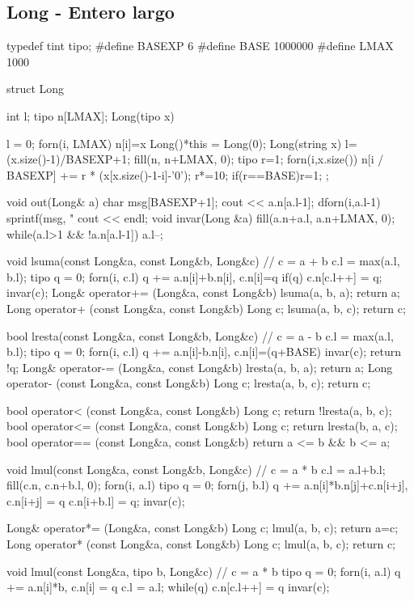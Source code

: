 \documentclass[10pt,landscape,twocolumn,a4paper,notitlepage]{article}
\begin{document}
\subsection{Long - Entero largo}\begin{code}
typedef tint tipo;
#define BASEXP 6
#define BASE 1000000
#define LMAX 1000

struct Long {
	int l;
	tipo n[LMAX];
	Long(tipo x) { 	l = 0; forn(i, LMAX) { n[i]=x%
	Long(){*this = Long(0);}
	Long(string x) {
		l=(x.size()-1)/BASEXP+1;
		fill(n, n+LMAX, 0);
		tipo r=1;
		forn(i,x.size()){
			n[i / BASEXP] += r * (x[x.size()-1-i]-'0');
			r*=10; if(r==BASE)r=1;
		}
	}
};

void out(Long& a) {
	char msg[BASEXP+1];
	cout << a.n[a.l-1];
	dforn(i,a.l-1) {
		sprintf(msg, "%
	}
	cout << endl;
}
void invar(Long &a) {
	fill(a.n+a.l, a.n+LMAX, 0);
	while(a.l>1 && !a.n[a.l-1]) a.l--;
}

void lsuma(const Long&a, const Long&b, Long&c) { // c = a + b
	c.l = max(a.l, b.l);
	tipo q = 0;
	forn(i, c.l) q += a.n[i]+b.n[i], c.n[i]=q%
	if(q) c.n[c.l++] = q;
	invar(c);
}
Long& operator+= (Long&a, const Long&b) { lsuma(a, b, a); return a; }
Long operator+ (const Long&a, const Long&b) { Long c; lsuma(a, b, c); return c; }

bool lresta(const Long&a, const Long&b, Long&c) { // c = a - b
	c.l = max(a.l, b.l);
	tipo q = 0;
	forn(i, c.l) q += a.n[i]-b.n[i], c.n[i]=(q+BASE)%
	invar(c);
	return !q;
}
Long& operator-= (Long&a, const Long&b) { lresta(a, b, a); return a; }
Long operator- (const Long&a, const Long&b) {Long c; lresta(a, b, c); return c;}

bool operator< (const Long&a, const Long&b) { Long c; return !lresta(a, b, c); }
bool operator<= (const Long&a, const Long&b) { Long c; return lresta(b, a, c); }
bool operator== (const Long&a, const Long&b) { return a <= b && b <= a; }

void lmul(const Long&a, const Long&b, Long&c) { // c = a * b
	c.l = a.l+b.l;
	fill(c.n, c.n+b.l, 0);
	forn(i, a.l) {
		tipo q = 0;
		forn(j, b.l) q += a.n[i]*b.n[j]+c.n[i+j], c.n[i+j] = q%
		c.n[i+b.l] = q;
	}
	invar(c);
}

Long& operator*= (Long&a, const Long&b) { Long c; lmul(a, b, c); return a=c; }
Long operator* (const Long&a, const Long&b) { Long c; lmul(a, b, c); return c; }

void lmul(const Long&a, tipo b, Long&c) { // c = a * b
	tipo q = 0;
	forn(i, a.l) q += a.n[i]*b, c.n[i] = q%
	c.l = a.l;
	while(q) c.n[c.l++] = q%
    invar(c);
}

}}
\end{code}
\end{document}
